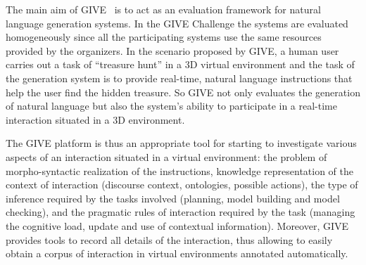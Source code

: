 The main aim of GIVE~\cite{byron09} is to act as an evaluation framework for
natural language generation systems. In the GIVE Challenge the systems are
evaluated homogeneously since all the participating systems use the same
resources provided by the organizers. In the scenario proposed by GIVE, a
human user carries out a task of ``treasure hunt'' in a 3D virtual environment
and the task of the generation system is to provide real-time, natural
language instructions that help the user find the hidden treasure. So GIVE not
only evaluates the generation of natural language but also the system's ability
to participate in a real-time interaction situated in a 3D environment.
% 

The GIVE platform is thus an appropriate tool for starting to investigate
various aspects of an interaction situated in a virtual environment: the problem
of
morpho-syntactic realization of the instructions, knowledge representation of
the context of interaction (discourse context, ontologies, possible actions),
the type of inference required by the tasks involved (planning, model building
and model checking), and the pragmatic rules of interaction required by the task
(managing the cognitive load, update and use of contextual information).
Moreover, GIVE provides tools to record all details of the interaction, thus
allowing to easily obtain a corpus of interaction in virtual environments
annotated automatically.


